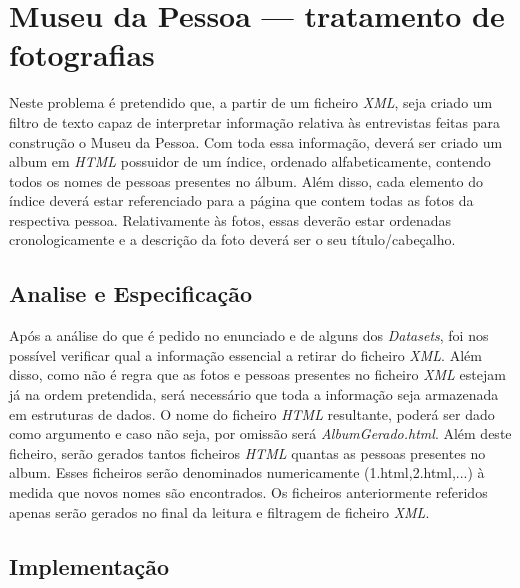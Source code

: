 \chapter{Museu da Pessoa — tratamento de fotografias}
\label{cap:museu}
Neste problema é pretendido que, a partir de um ficheiro \emph{XML}, seja criado um filtro de texto capaz de interpretar informação relativa às entrevistas feitas para construção o Museu da Pessoa. Com toda essa informação, deverá ser criado um album em \emph{HTML} possuidor de um índice, ordenado alfabeticamente, contendo todos os nomes de pessoas presentes no álbum. Além disso, cada elemento do índice deverá estar referenciado para a página que contem todas as fotos da respectiva pessoa. Relativamente às fotos, essas deverão estar ordenadas cronologicamente e a descrição da foto deverá ser o seu título/cabeçalho.

\section{Analise e Especificação}
\label{seq:museu-ana}
Após a análise do que é pedido no enunciado e de alguns dos \emph{Datasets}, foi nos possível verificar qual a informação essencial a retirar do ficheiro \emph{XML}. Além disso, como não é regra que as fotos e pessoas presentes no ficheiro \emph{XML} estejam já na ordem pretendida, será necessário que toda a informação seja armazenada em estruturas de dados. O nome do ficheiro \emph{HTML} resultante, poderá ser dado como argumento e caso não seja, por omissão será \emph{AlbumGerado.html}. Além deste ficheiro, serão gerados tantos ficheiros \emph{HTML} quantas as pessoas presentes no album. Esses ficheiros serão denominados numericamente (1.html,2.html,...) à medida que novos nomes são encontrados. Os ficheiros anteriormente referidos apenas serão gerados no final da leitura e filtragem de ficheiro \emph{XML}.


\section{Implementação}
\label{seq:museu-imp}

